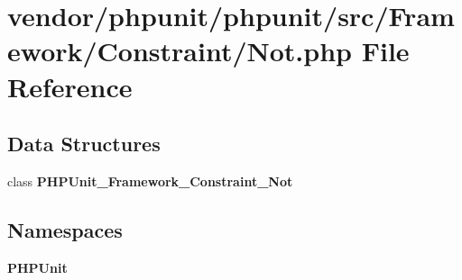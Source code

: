 \section{vendor/phpunit/phpunit/src/\+Framework/\+Constraint/\+Not.php File Reference}
\label{_not_8php}
\subsection*{Data Structures}
\begin{DoxyCompactItemize}
\item 
class {\bf P\+H\+P\+Unit\+\_\+\+Framework\+\_\+\+Constraint\+\_\+\+Not}
\end{DoxyCompactItemize}
\subsection*{Namespaces}
\begin{DoxyCompactItemize}
\item 
 {\bf P\+H\+P\+Unit}
\end{DoxyCompactItemize}

